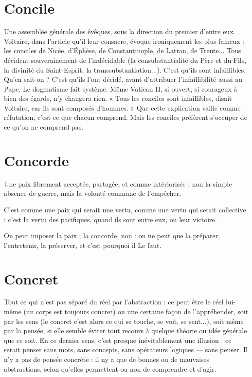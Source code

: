 \section{Concile}
Une assemblée générale des évêques, sous la direction du premier
d’entre eux. Voltaire, dans l’article qu’il leur consacre,
évoque ironiquement les plus fameux : les conciles de Nicée, d’Éphèse, de
Constantinople, de Latran, de Trente... Tous décident souverainement de
l’indécidable (la consubstantialité du Père et du Fils, la divinité du Saint-Esprit,
la transsubstantiation...). C’est qu’ils sont infaillibles. Qu’en sait-on ? C’est
qu’ils l'ont décidé, avant d’attribuer l’infaillibilité aussi au Pape. Le dogmatisme
fait système. Même Vatican II, si ouvert, si courageux à bien des égards,
n’y changera rien. « Tous les conciles sont infaillibles, disait Voltaire, car ils
sont composés d’hommes. » Que cette explication vaille comme réfutation,
c'est ce que chacun comprend. Mais les conciles préfèrent s'occuper de ce
qu’on ne comprend pas.

\section{Concorde}
Une paix librement acceptée, partagée, et comme intériorisée :
non la simple absence de guerre, mais la volonté commune de l'empêcher.

C’est comme une paix qui serait une vertu, comme une vertu qui serait
collective : c’est la vertu des pacifiques, quand ils sont entre eux, ou leur victoire.

On peut imposer la paix ; la concorde, non : on ne peut que la préparer,
l’entretenir, la préserver, et c’est pourquoi il Le faut.

\section{Concret}
Tout ce qui n’est pas séparé du réel par l’abstraction : ce peut
être le réel lui-même (un corps est toujours concret) ou une
certaine façon de l’appréhender, soit par les sens (le concret c’est alors ce qui se
touche, se voit, se sent...), soit même par la pensée, si elle semble éviter tout
recours à quelque théorie ou idée générale que ce soit. En ce dernier sens, c’est
presque inévitablement une illusion : ce serait penser sans mots, sans concepts,
sans opérateurs logiques — sans penser. Il n’y a pas de pensée concrète : il ny a
que de bonnes ou de mauvaises abstractions, selon qu’elles permettent ou non
de comprendre et d’agir.

